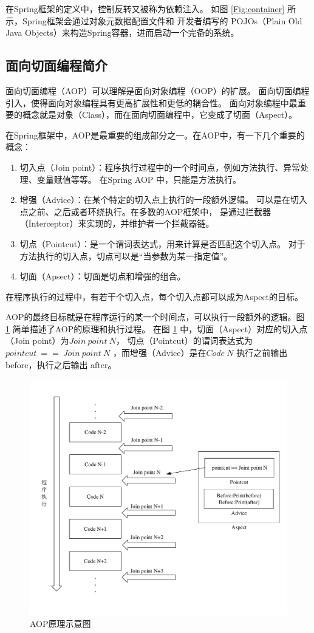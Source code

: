 在Spring框架的定义中，控制反转又被称为依赖注入。
如图 \ref{Fig:container} 所示，Spring框架会通过对象元数据配置文件和
开发者编写的 POJOs（Plain Old Java Objects）来构造Spring容器，进而启动一个完备的系统。

\subsection{面向切面编程简介}
面向切面编程（AOP）可以理解是面向对象编程（OOP）的扩展。
面向切面编程引入，使得面向对象编程具有更高扩展性和更低的耦合性。
面向对象编程中最重要的概念就是对象（Class），而在面向切面编程中，它变成了切面（Aspect）。

在Spring框架中，AOP是最重要的组成部分之一。在AOP中，有一下几个重要的概念：
\begin{enumerate}
    \item 切入点（Join point）：程序执行过程中的一个时间点，例如方法执行、异常处理、变量赋值等等。
    在Spring AOP 中，只能是方法执行。
    \item 增强（Advice）：在某个特定的切入点上执行的一段额外逻辑。
    可以是在切入点之前、之后或者环绕执行。在多数的AOP框架中，
    是通过拦截器（Interceptor）来实现的，并维护者一个拦截器链。
    \item 切点（Pointcut）：是一个谓词表达式，用来计算是否匹配这个切入点。
    对于方法执行的切入点，切点可以是“当参数为某一指定值”。
    \item 切面（Apsect）：切面是切点和增强的组合。
\end{enumerate}

在程序执行的过程中，有若干个切入点，每个切入点都可以成为Aspect的目标。

AOP的最终目标就是在程序运行的某一个时间点，可以执行一段额外的逻辑。图 \ref{Fig:aop} 
简单描述了AOP的原理和执行过程。
在图 \ref{Fig:aop} 中，切面（Aspect）对应的切入点（Join point）为$Join\ point\ N$，
切点（Pointcut）的谓词表达式为$ pointcut\ ==\ Join\ point\ N$
，而增强（Advice）是在$Code\ N$ 执行之前输出 before，执行之后输出 after。

\begin{figure}[ht]
    \centering   
    \includegraphics[width=0.8\linewidth]{./Figure/IMG_aop.pdf}
    \caption{AOP原理示意图}\label{Fig:aop}
\end{figure}

